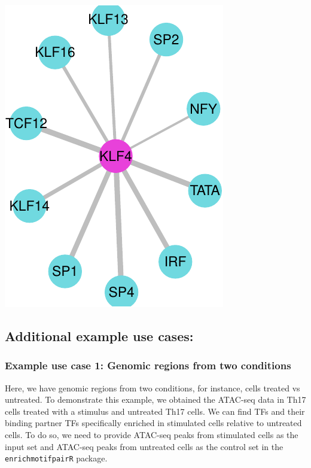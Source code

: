 \documentclass[
]{article}
\begin{document}
\includegraphics{enrichmotifpairR_user_manual_guide_files/figure-latex/H1_ESC_6-3.pdf}

\hypertarget{additional-example-use-cases}{%
\subsection{Additional example use
cases:}\label{additional-example-use-cases}}

\hypertarget{example-use-case-1-genomic-regions-from-two-conditions}{%
\subsubsection{Example use case 1: Genomic regions from two
conditions}\label{example-use-case-1-genomic-regions-from-two-conditions}}

Here, we have genomic regions from two conditions, for instance, cells
treated vs untreated. To demonstrate this example, we obtained the
ATAC-seq data in Th17 cells treated with a stimulus and untreated Th17
cells. We can find TFs and their binding partner TFs specifically
enriched in stimulated cells relative to untreated cells. To do so, we
need to provide ATAC-seq peaks from stimulated cells as the input set
and ATAC-seq peaks from untreated cells as the control set in the
\texttt{enrichmotifpairR} package.
\end{document}
